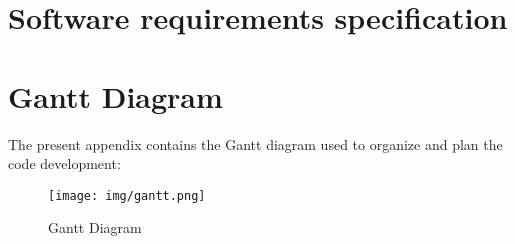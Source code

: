 \begin{appendices}
\chapter{Software requirements specification}
	


\chapter{Gantt Diagram}
The present appendix contains the Gantt diagram used to organize and plan the code development:
\begin{figure}[h]
	\centering
    \texttt{[image: img/gantt.png]}
	\caption[Gantt Diagram]{Gantt Diagram}	
\end{figure}

\end{appendices}